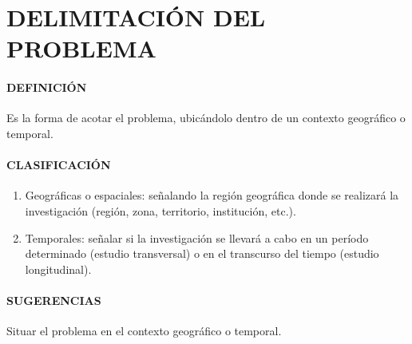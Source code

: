 \section{DELIMITACIÓN DEL PROBLEMA}

\paragraph{DEFINICIÓN}
Es la forma de acotar el problema, ubicándolo dentro de un contexto geográfico o temporal.

\paragraph{CLASIFICACIÓN}
\begin{enumerate}
 \item Geográficas o espaciales: señalando la región geográfica donde se realizará la investigación (región, zona, territorio, institución, etc.).
 \item Temporales: señalar si la investigación se llevará a cabo en un período determinado (estudio transversal) o en el transcurso del tiempo (estudio longitudinal).
\end{enumerate}

\paragraph{SUGERENCIAS}
Situar el problema en el contexto geográfico o temporal.

